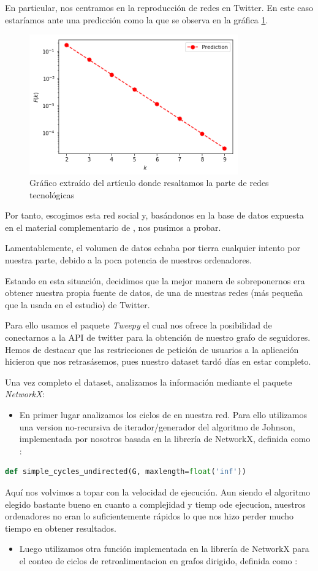 \documentclass[1p]{elsarticle}
\begin{document}
En particular, nos centramos en la reproducción de redes en Twitter. En este caso estaríamos ante una predicción como la que se observa en la gráfica \ref{h2}.
\begin{figure}
	\centering
	\includegraphics[width=9cm]{graf_4.png}
	\caption{Gráfico extraído del artículo donde resaltamos la parte de redes tecnológicas}
	\label{h2}
\end{figure}


Por tanto, escogimos esta red social y, basándonos en la base de datos expuesta en el material complementario de \cite{arti}, nos pusimos a probar.

Lamentablemente, el volumen de datos echaba por tierra cualquier intento por nuestra parte, debido a la poca potencia de nuestros ordenadores. 

Estando en esta situación, decidimos que la mejor manera de sobreponernos era obtener nuestra propia fuente de datos, de una de nuestras redes (más pequeña que la usada en el estudio) de Twitter.

Para ello usamos el paquete \textit{Tweepy} el cual nos ofrece la posibilidad de conectarnos a la API de twitter para la obtención de nuestro grafo de seguidores. Hemos de destacar que las restricciones de petición de usuarios a la aplicación hicieron que nos retrasásemos, pues nuestro dataset tardó días en estar completo.

Una vez completo el dataset, analizamos la información mediante el paquete  \textit{NetworkX}:
\begin{itemize}
	\item En primer lugar analizamos  los ciclos de en nuestra red. Para ello utilizamos una version no-recursiva de iterador/generador del algoritmo de Johnson, implementada por nosotros basada en la librería de NetworkX, definida como :
\end{itemize}

	\begin{lstlisting}[language=Python]
	def simple_cycles_undirected(G, maxlength=float('inf'))\end{lstlisting}
Aquí nos volvimos a topar con la velocidad de ejecución. Aun siendo el algoritmo elegido bastante bueno en cuanto a complejidad y tiemp ode ejecucion, nuestros ordenadores no eran lo suficientemente rápidos lo que nos hizo perder mucho tiempo en obtener resultados.
\begin{itemize}
	\item Luego utilizamos otra función implementada en la librería de NetworkX para el conteo de ciclos de retroalimentacion en grafos dirigido, definida como :
\end{itemize}
\end{document}
